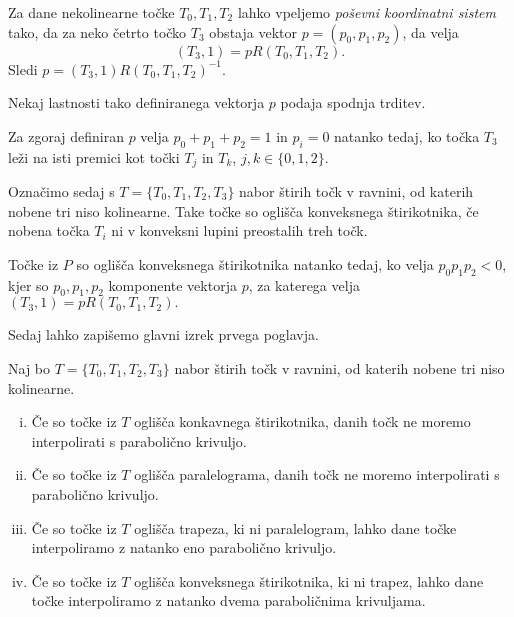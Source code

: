 \documentclass[mat1]{fmfdelo}
\begin{document}









Za dane nekolinearne točke $T_0, T_1, T_2$ lahko vpeljemo \emph{poševni koordinatni sistem} tako, da za neko četrto točko $T_3$ obstaja vektor $p = (p_0, p_1, p_2)$, da velja
$$(T_3, 1) = p R(T_0, T_1, T_2).$$ Sledi $ p = (T_3, 1) R(T_0, T_1, T_2)^{-1}$.

Nekaj lastnosti tako definiranega vektorja $p$ podaja spodnja trditev.

\begin{trditev}
Za zgoraj definiran $p$ velja $p_0 + p_1 + p_2 = 1$ in $p_i = 0$ natanko tedaj, ko točka $T_3$ leži na isti premici kot točki $T_j$ in $T_k$, $j, k \in \{0, 1, 2 \}$. 
\end{trditev}

Označimo sedaj s $T = \{T_0, T_1, T_2, T_3 \}$ nabor štirih točk v ravnini, od katerih nobene tri niso kolinearne. Take točke so oglišča konveksnega štirikotnika, če nobena točka $T_i$ ni v konveksni lupini preostalih treh točk.

\begin{trditev}
Točke iz $P$ so oglišča konveksnega štirikotnika natanko tedaj, ko velja $p_0 p_1 p_2 < 0$, kjer so $p_0, p_1, p_2$ komponente vektorja $p$, za katerega velja $(T_3, 1) = p R(T_0, T_1, T_2).$
\end{trditev}

Sedaj lahko zapišemo glavni izrek prvega poglavja.

\begin{izrek}
Naj bo $T = \{ T_0, T_1, T_2, T_3 \}$ nabor štirih točk v ravnini, od katerih nobene tri niso kolinearne.

\begin{enumerate}[i)]

\item Če so točke iz $T$ oglišča konkavnega štirikotnika, danih točk ne moremo interpolirati s parabolično krivuljo.

\item Če so točke iz $T$ oglišča paralelograma, danih točk ne moremo interpolirati s parabolično krivuljo.

\item Če so točke iz $T$ oglišča trapeza, ki ni paralelogram, lahko dane točke interpoliramo z natanko eno parabolično krivuljo.

\item Če so točke iz $T$ oglišča konveksnega štirikotnika, ki ni trapez, lahko dane točke interpoliramo z natanko dvema paraboličnima krivuljama.
\end{enumerate}

\end{izrek}
\end{document}
